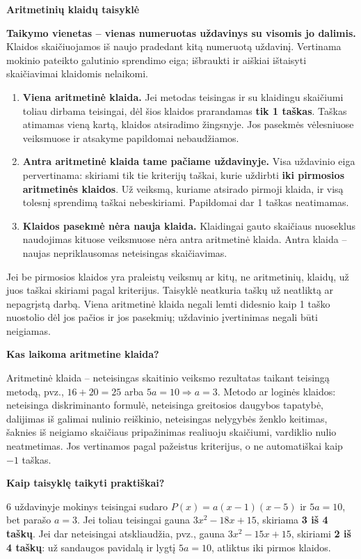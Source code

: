 \documentclass[11pt]{article}
\newcommand{\sk}[1]{\par\medskip\textbf{#1}\par}
\begin{document}
\sk{Aritmetinių klaidų taisyklė}
\textbf{Taikymo vienetas -- vienas numeruotas uždavinys su visomis jo dalimis.} Klaidos skaičiuojamos iš naujo pradedant kitą numeruotą uždavinį. Vertinama mokinio pateikto galutinio sprendimo eiga; išbraukti ir aiškiai ištaisyti skaičiavimai klaidomis nelaikomi.
\begin{enumerate}
\item \textbf{Viena aritmetinė klaida.} Jei metodas teisingas ir su klaidingu skaičiumi toliau dirbama teisingai, dėl šios klaidos prarandamas \textbf{tik 1 taškas}. Taškas atimamas vieną kartą, klaidos atsiradimo žingsnyje. Jos pasekmės vėlesniuose veiksmuose ir atsakyme papildomai nebaudžiamos.
\item \textbf{Antra aritmetinė klaida tame pačiame uždavinyje.} Visa uždavinio eiga pervertinama: skiriami tik tie kriterijų taškai, kurie uždirbti \textbf{iki pirmosios aritmetinės klaidos}. Už veiksmą, kuriame atsirado pirmoji klaida, ir visą tolesnį sprendimą taškai nebeskiriami. Papildomai dar 1 taškas neatimamas.
\item \textbf{Klaidos pasekmė nėra nauja klaida.} Klaidingai gauto skaičiaus nuoseklus naudojimas kituose veiksmuose nėra antra aritmetinė klaida. Antra klaida -- naujas nepriklausomas neteisingas skaičiavimas.
\end{enumerate}
Jei be pirmosios klaidos yra praleistų veiksmų ar kitų, ne aritmetinių, klaidų, už juos taškai skiriami pagal kriterijus. Taisyklė neatkuria taškų už neatliktą ar nepagrįstą darbą. Viena aritmetinė klaida negali lemti didesnio kaip 1 taško nuostolio dėl jos pačios ir jos pasekmių; uždavinio įvertinimas negali būti neigiamas.

\sk{Kas laikoma aritmetine klaida?}
Aritmetinė klaida -- neteisingas skaitinio veiksmo rezultatas taikant teisingą metodą, pvz., $16+20=25$ arba $5a=10\Rightarrow a=3$.
Metodo ar loginės klaidos: neteisinga diskriminanto formulė, neteisinga greitosios daugybos tapatybė, dalijimas iš galimai nulinio reiškinio, neteisingas nelygybės ženklo keitimas, šaknies iš neigiamo skaičiaus pripažinimas realiuoju skaičiumi, vardiklio nulio neatmetimas. Jos vertinamos pagal pažeistus kriterijus, o ne automatiškai kaip $-1$ taškas.

\sk{Kaip taisyklę taikyti praktiškai?}
6 uždavinyje mokinys teisingai sudaro $P(x)=a(x-1)(x-5)$ ir $5a=10$, bet parašo $a=3$. Jei toliau teisingai gauna $3x^2-18x+15$, skiriama \textbf{3 iš 4 taškų}. Jei dar neteisingai atskliaudžia, pvz., gauna $3x^2-15x+15$, skiriami \textbf{2 iš 4 taškų}: už sandaugos pavidalą ir lygtį $5a=10$, atliktus iki pirmos klaidos.
\end{document}
